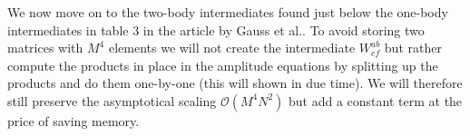 
        We now move on to the two-body intermediates found just below the
        one-body intermediates in table 3 in the article by Gauss et
        al.\cite{gauss1995coupled}. To avoid storing two matrices with $M^4$
        elements we will not create the intermediate $W^{ab}_{ef}$ but rather
        compute the products in place in the amplitude equations by splitting up
        the products and do them one-by-one (this will shown in due time).
        We will therefore still preserve the asymptotical scaling
        $\mathcal{O}(M^4N^2)$ but add a constant term at the price of saving
        memory.
